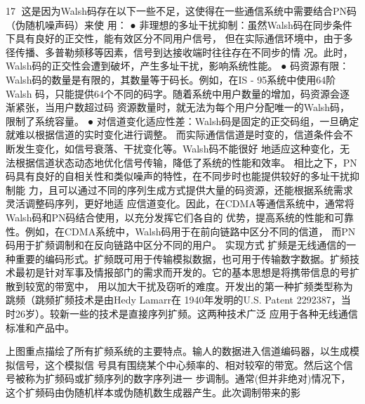                                                                  17
这是因为Walsh码存在以下一些不足，这使得在一些通信系统中需要结合PN码（伪随机噪声码）来使
用：
 ● 非理想的多址干扰抑制：虽然Walsh码在同步条件下具有良好的正交性，能有效区分不同用户信号，
   但在实际通信环境中，由于多径传播、多普勒频移等因素，信号到达接收端时往往存在不同步的情
   况。此时，Walsh码的正交性会遭到破坏，产生多址干扰，影响系统性能。
 ● 码资源有限：Walsh码的数量是有限的，其数量等于码长。例如，在IS - 95系统中使用64阶Walsh
   码，只能提供64个不同的码字。随着系统中用户数量的增加，码资源会逐渐紧张，当用户数超过码
   资源数量时，就无法为每个用户分配唯一的Walsh码，限制了系统容量。
 ● 对信道变化适应性差：Walsh码是固定的正交码组，一旦确定就难以根据信道的实时变化进行调整。
   而实际通信信道是时变的，信道条件会不断发生变化，如信号衰落、干扰变化等。Walsh码不能很好
   地适应这种变化，无法根据信道状态动态地优化信号传输，降低了系统的性能和效率。
相比之下，PN码具有良好的自相关性和类似噪声的特性，在不同步时也能提供较好的多址干扰抑制能
力，且可以通过不同的序列生成方式提供大量的码资源，还能根据系统需求灵活调整码序列，更好地适
应信道变化。因此，在CDMA等通信系统中，通常将Walsh码和PN码结合使用，以充分发挥它们各自的
优势，提高系统的性能和可靠性。例如，在CDMA系统中，Walsh码用于在前向链路中区分不同的信道，
而PN码用于扩频调制和在反向链路中区分不同的用户。
实现方式
扩频是无线通信的一种重要的编码形式。扩频既可用于传输模拟数据，也可用于传输数字数据。扩频技
术最初是针对军事及情报部门的需求而开发的。它的基本思想是将携带信息的号扩散到较宽的带宽中，
用以加大干扰及窃听的难度。开发出的第一种扩频类型称为跳频（跳频扩频技术是由Hedy Lamarr在
1940年发明的U.S. Patent 2292387，当时26岁）。较新一些的技术是直接序列扩频。这两种技术广泛
应用于各种无线通信标准和产品中。




上图重点描绘了所有扩频系统的主要特点。输人的数据进入信道编码器，以生成模拟信号，这个模拟信
号具有围绕某个中心频率的、相对较窄的带宽。然后这个信号被称为扩频码或扩频序列的数字序列进一
步调制。通常(但并非绝对)情况下，这个扩频码由伪随机样本或伪随机数生成器产生。此次调制带来的影


